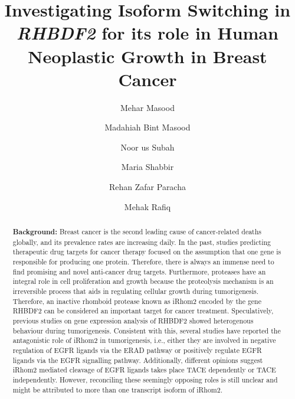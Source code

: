 \documentclass[fleqn,10pt,lineno]{wlpeerj}
\begin{document}
\title{Investigating Isoform Switching in \textit{RHBDF2} for its role in Human Neoplastic Growth in Breast Cancer}

\author[1]{Mehar Masood}
\author[1]{Madahiah Bint Masood}
\author[1]{Noor us Subah}
\author[2]{Maria Shabbir}
\author[1]{Rehan Zafar Paracha}
\author[1]{Mehak Rafiq}




\begin{abstract}
\textbf{Background:} Breast cancer is the second leading cause of cancer-related deaths globally, and its prevalence rates are increasing daily. In the past, studies predicting therapeutic drug targets for cancer therapy focused on the assumption that one gene is responsible for producing one protein. Therefore, there is always an immense need to find promising and novel anti-cancer drug targets. Furthermore, proteases have an integral role in cell proliferation and growth because the proteolysis mechanism is an irreversible process that aids in regulating cellular growth during tumorigenesis. Therefore, an inactive rhomboid protease known as iRhom2 encoded by the gene RHBDF2 can be considered an important target for cancer treatment. Speculatively, previous studies on gene expression analysis of RHBDF2 showed heterogenous behaviour during tumorigenesis. Consistent with this, several studies have reported the antagonistic role of iRhom2 in tumorigenesis, i.e., either they are involved in negative regulation of EGFR ligands via the ERAD pathway or positively regulate EGFR ligands via the EGFR signalling pathway. Additionally, different opinions suggest iRhom2 mediated cleavage of EGFR ligands takes place TACE dependently or TACE independently. However, reconciling these seemingly opposing roles is still unclear and might be attributed to more than one transcript isoform of iRhom2.\par


\end{abstract}
\end{document}
